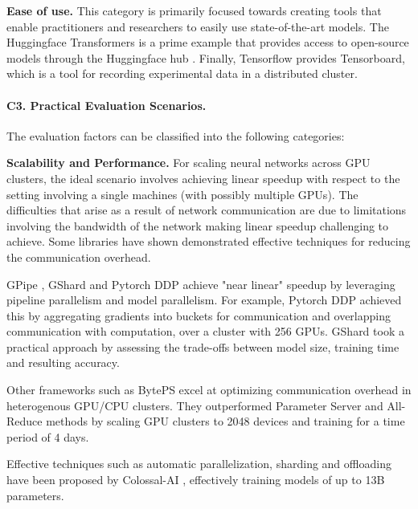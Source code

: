\textbf{Ease of use.}
This category is primarily focused towards creating tools that enable practitioners and researchers to easily
use state-of-the-art models. The Huggingface Transformers \cite{wolf_huggingfaces_2020} is a prime example
that provides access to open-source models through the Huggingface hub \cite{noauthor_hugging_2025}.
Finally, Tensorflow \cite{abadi_tensorflow_2016} provides Tensorboard, which is a tool for recording
experimental data in a distributed cluster.

\paragraph{C3. Practical Evaluation Scenarios.}
The evaluation factors can be classified into the following categories:

\textbf{Scalability and Performance.}
For scaling neural networks across GPU clusters, the ideal scenario involves achieving linear speedup
with respect to the setting involving a single machines (with possibly multiple GPUs). The difficulties
that arise as a result of network communication are due to limitations involving the bandwidth of the
network making linear speedup challenging to achieve. Some libraries have shown demonstrated
effective techniques for reducing the communication overhead.

GPipe \cite{huang_gpipe_2019}, GShard \cite{lepikhin_gshard_2020} and Pytorch DDP
\cite{li_pytorch_2020} achieve "near linear" speedup by leveraging pipeline parallelism and model
parallelism. For example, Pytorch DDP achieved this by aggregating gradients into buckets for
communication and overlapping communication with computation, over a cluster with 256 GPUs. GShard
took a practical approach by assessing the trade-offs between model size, training time and
resulting accuracy.

Other frameworks such as BytePS \cite{jiang_unified_nodate} excel at optimizing communication
overhead in heterogenous GPU/CPU clusters. They outperformed Parameter Server and All-Reduce
methods by scaling GPU clusters to 2048 devices and training for a time period of 4 days.

Effective techniques such as automatic parallelization, sharding and offloading have been proposed
by Colossal-AI \cite{li_colossal-ai_2023}, effectively training models of up to 13B parameters.

